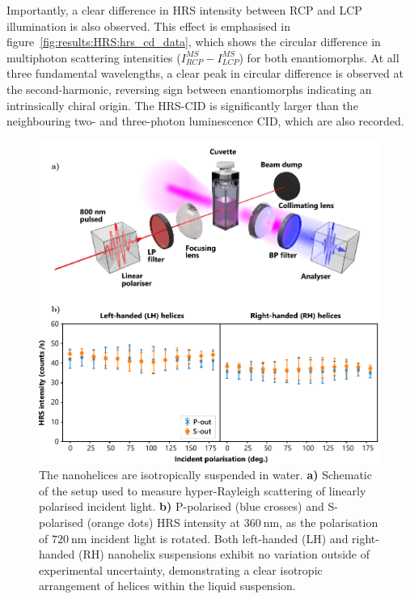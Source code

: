 Importantly, a clear difference in HRS intensity between RCP and LCP illumination is also observed. 
This effect is emphasised in figure~\ref{fig:results:HRS:hrs_cd_data}, which shows the circular difference in multiphoton scattering intensities ($I_{RCP}^{MS}-I_{LCP}^{MS}$) for both enantiomorphs. At all three fundamental wavelengths, a clear peak in circular difference is observed at the second-harmonic, reversing sign between enantiomorphs indicating an intrinsically chiral origin. The HRS-CID is significantly larger than the neighbouring two- and three-photon luminescence CID, which are also recorded. 

\begin{figure}[htb!]	
    \centering	
    \includegraphics[scale=1]{./figures/results/HRS/hrs_linpol_data.pdf}
    \caption{\label{fig:results:HRS:hrs_linpol_data}
    The nanohelices are isotropically suspended in water. \textbf{a)} Schematic of the setup used to measure hyper-Rayleigh scattering of linearly polarised incident light. \textbf{b)} P-polarised (blue crosses) and S-polarised (orange dots) HRS intensity at $\SI{360}{\nano\m}$, as the polarisation of $\SI{720}{\nano\m}$ incident light is rotated. Both left-handed (LH) and right-handed (RH) nanohelix suspensions exhibit no variation outside of experimental uncertainty, demonstrating a clear isotropic arrangement of helices within the liquid suspension.}	
\end{figure}

